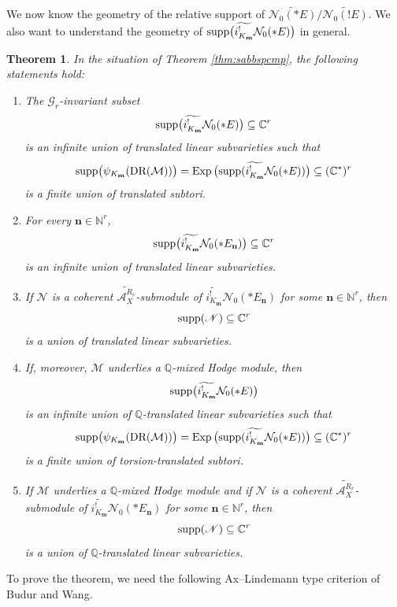 \documentclass{amsart}
\theoremstyle{plain}
\newtheorem{theorem}{Theorem}
\numberwithin{theorem}{section}
\theoremstyle{definition}
\theoremstyle{remark}
\theoremstyle{definition}
\newcommand{\wt}{\widetilde}
\newcommand{\C}{\mathbb{C}} %
\newcommand{\N}{\mathbb{N}}
\newcommand{\Q}{\mathbb{Q}}
\newcommand{\cM}{\mathcal{M}}
\newcommand{\cN}{\mathcal{N}}
\newcommand{\bn}{\mathbf{n}}
\newcommand{\bm}{\mathbf{m}}
\newcommand{\sN}{\mathscr{N}}
\newcommand{\sA}{\mathscr{A}}
\newcommand{\sG}{\mathscr{G}}
\newcommand{\DR}{\textup{DR}}
\newcommand{\supp}{\textup{supp}}
\begin{document}
We now know the geometry of the relative support of
${\wt{\cN_0(*E)}}/{\wt{\cN_0(!E)}}$.
We also want to understand the geometry of
$\supp\big(\wt{i^!_{K_\bm}}\cN_0(*E)\big)$
in general.

\begin{theorem}\label{thm:linearsupp}
In the situation of Theorem \ref{thm:sabbspcmp}, the following statements hold:
\begin{enumerate}[label=$(\arabic*)$]
    \item The $\sG_r$-invariant subset
    \[
    \supp\big(\wt{i^!_{K_\bm}}\cN_0(*E)\big)\subseteq \C^r
    \]
    is an infinite union of translated linear subvarieties such that
    \[
    \supp\big(\psi_{K_\bm}(\DR(\cM))\big)
    =
    \operatorname{Exp}
    \big(
    \supp(\wt{i^!_{K_\bm}}\cN_0(*E))
    \big)
    \subseteq
    (\C^*)^r
    \]
    is a finite union of translated subtori.

    \item For every $\bn\in \N^r$,
    \[
    \supp\big(\wt{i^!_{K_\bm}}\cN_0(*E_\bn)\big)\subseteq \C^r
    \]
    is an infinite union of translated linear subvarieties.

    \item If $\sN$ is a coherent $\wt{\sA_X^{R_r}}$-submodule of
    $\wt{i^!_{K_\bm}}\cN_0(*E_\bn)$ for some $\bn\in \N^r$, then
    \[
    \supp(\sN)\subseteq \C^r
    \]
    is a union of translated linear subvarieties.

    \item If, moreover, $\cM$ underlies a $\Q$-mixed Hodge module, then
    \[
    \supp\big(\wt{i^!_{K_\bm}}\cN_0(*E)\big)
    \]
    is an infinite union of $\Q$-translated linear subvarieties such that
    \[
    \supp\big(\psi_{K_\bm}(\DR(\cM))\big)
    =
    \operatorname{Exp}
    \big(
    \supp(\wt{i^!_{K_\bm}}\cN_0(*E))
    \big)
    \subseteq
    (\C^*)^r
    \]
    is a finite union of torsion-translated subtori.

    \item If $\cM$ underlies a $\Q$-mixed Hodge module and if $\sN$ is a
    coherent $\wt{\sA_X^{R_r}}$-submodule of
    $\wt{i^!_{K_\bm}}\cN_0(*E_\bn)$ for some $\bn\in \N^r$, then
    \[
    \supp(\sN)\subseteq \C^r
    \]
    is a union of $\Q$-translated linear subvarieties.
\end{enumerate}
\end{theorem}

To prove the theorem, we need the following Ax--Lindemann type criterion of
Budur and Wang.
\end{document}
